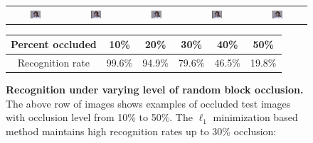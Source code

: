 \renewcommand{\tempwidth}{0.2\textwidth}
\begin{figure}
\centering
\begin{tabular}{@{}c@{}c@{}c@{}c@{}c@{}}
\includegraphics[width=\tempwidth,clip=true]{figures_pami/multipie_occ/occ10.png} &
\includegraphics[width=\tempwidth,clip=true]{figures_pami/multipie_occ/occ20.png} &
\includegraphics[width=\tempwidth,clip=true]{figures_pami/multipie_occ/occ30.png} &
\includegraphics[width=\tempwidth,clip=true]{figures_pami/multipie_occ/occ40.png} &
\includegraphics[width=\tempwidth,clip=true]{figures_pami/multipie_occ/occ50.png}  \\
\end{tabular}
\caption{\small{\bf Recognition under varying level of random block occlusion.}
The above row of images shows examples of occluded test images with occlusion
level from 10\% to 50\%. The $\ell_1$ minimization based method maintains high recognition rates up to 30\%
occlusion:}
{
\begin{tabular}{|c|c|c|c|c|c| }
\hline
Percent occluded & 10\% & 20\% & 30\% & 40\% & 50\%  \\
\hline
Recognition rate & 99.6\% & 94.9\% & 79.6\% & 46.5\% & 19.8\% \\
\hline
\end{tabular}
}
\label{fig:multipie-occ-rec}
\end{figure}

